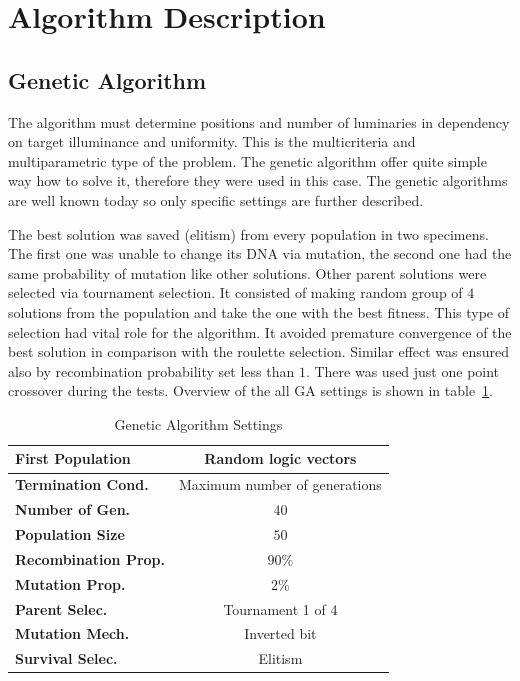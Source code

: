 \section{Algorithm Description}
\subsection{Genetic Algorithm}
\label{ssec:GenAlg}
The algorithm must determine positions and number of luminaries in dependency on target illuminance and uniformity. This is the multicriteria and multiparametric type of the problem. The genetic algorithm offer quite simple way how to solve it, therefore they were used in this case. The genetic algorithms are well known today so only specific settings are further described.

The best solution was saved (elitism) from every population in two specimens. The first one was unable to change its DNA via mutation, the second one had the same probability of mutation like other solutions. Other parent solutions were selected via tournament selection. It consisted of making random group of $4$ solutions from the population and take the one with the best fitness. This type of selection had vital role for the algorithm. It avoided premature convergence of the best solution in comparison with the roulette selection. Similar effect was ensured also by recombination probability set less than $1$. There was used just one point crossover during the tests. Overview of the all GA settings is shown in table~\ref{tab:GAsettings}.

\begin{table}[htb]
	\renewcommand{\arraystretch}{1.3}
	\caption{Genetic Algorithm Settings}
 	\label{tab:GAsettings}
	\centering
  \begin{tabular}{| l | c |}
    \hline
    \textbf{First Population} & Random logic vectors \\
    \hline
    \textbf{Termination Cond.} & Maximum number of generations \\
    \hline
		\textbf{Number of Gen.} & $40$ \\
    \hline
		\textbf{Population Size} & $50$ \\
    \hline
		\textbf{Recombination Prop.} & $90 \%$ \\
    \hline
		\textbf{Mutation Prop.} & $2 \%$ \\
    \hline
		\textbf{Parent Selec.} & Tournament 1 of 4 \\
    \hline
		\textbf{Mutation Mech.} & Inverted bit \\
    \hline
		\textbf{Survival Selec.} & Elitism \\
    \hline
  \end{tabular}
\end{table}

